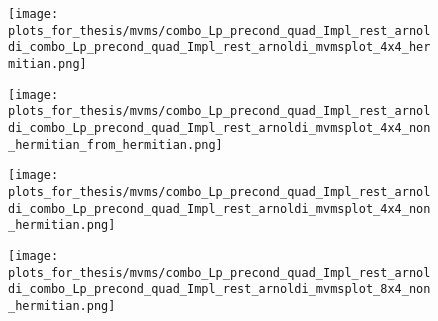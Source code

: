 \begin{figure}[H]
    \centering
    \begin{minipage}{0.45\textwidth}
        \centering
        \texttt{[image: plots\_for\_thesis/mvms/combo\_Lp\_precond\_quad\_Impl\_rest\_arnoldi\_combo\_Lp\_precond\_quad\_Impl\_rest\_arnoldi\_mvmsplot\_4x4\_hermitian.png]} %
    \end{minipage}%
    \hspace{0.02\textwidth} %
    \begin{minipage}{0.45\textwidth}
        \centering
        \texttt{[image: plots\_for\_thesis/mvms/combo\_Lp\_precond\_quad\_Impl\_rest\_arnoldi\_combo\_Lp\_precond\_quad\_Impl\_rest\_arnoldi\_mvmsplot\_4x4\_non\_hermitian\_from\_hermitian.png]} %
    \end{minipage}
    
    \vspace{0.02\textwidth} %
    
    \begin{minipage}{0.45\textwidth}
        \centering
        \texttt{[image: plots\_for\_thesis/mvms/combo\_Lp\_precond\_quad\_Impl\_rest\_arnoldi\_combo\_Lp\_precond\_quad\_Impl\_rest\_arnoldi\_mvmsplot\_4x4\_non\_hermitian.png]} %
    \end{minipage}%
    \hspace{0.02\textwidth} %
    \begin{minipage}{0.45\textwidth}
        \centering
        \texttt{[image: plots\_for\_thesis/mvms/combo\_Lp\_precond\_quad\_Impl\_rest\_arnoldi\_combo\_Lp\_precond\_quad\_Impl\_rest\_arnoldi\_mvmsplot\_8x4\_non\_hermitian.png]} %
    \end{minipage}
    

\end{figure}
